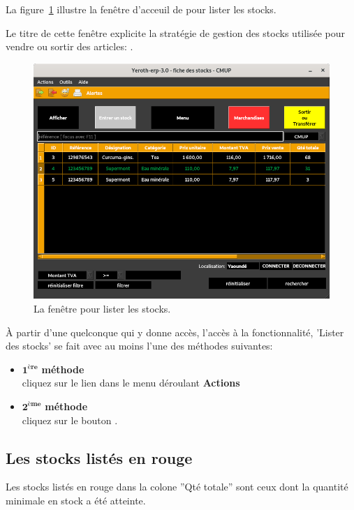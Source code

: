 La figure~\ref{fig:fenetre-lister} illustre la fen\^etre
d'acceuil de \yeren pour lister les stocks.

Le titre de cette fen\^etre explicite la strat\'egie
de gestion des stocks utilis\'ee pour vendre ou
sortir des articles: \cmup.\\

\begin{figure}[!htbp]
\centering
\includegraphics[scale=0.63]{images/yeren-fenetre-lister.png}
\caption{La fen\^etre pour lister les stocks.}
\label{fig:fenetre-lister}
\end{figure}

\`A partir d'une \fenetre quelconque qui y donne
acc\`es, l'acc\`es \`a la fonctionnalit\'e, 'Lister des stocks'
se fait avec au moins l'une des m\'ethodes suivantes: 

\begin{itemize}[]
	\item \textcolor{purplish}{$\mathbf{1^{\text{\`ere}}}$ \textbf{m\'ethode}}\\
		cliquez sur le lien 
		dans le menu d\'eroulant \textbf{Actions}\\

	\item \textcolor{purplish}{$\mathbf{2^{\text{\`eme}}}$ \textbf{m\'ethode}}\\
		cliquez sur le bouton .
\end{itemize}

\subsection{Les stocks list\'es en rouge}
Les stocks list\'es en \textcolor{firebrickred}{rouge} dans
la colone ''Qt\'e totale'' sont ceux dont la quantit\'e
minimale en stock a \'et\'e atteinte.

